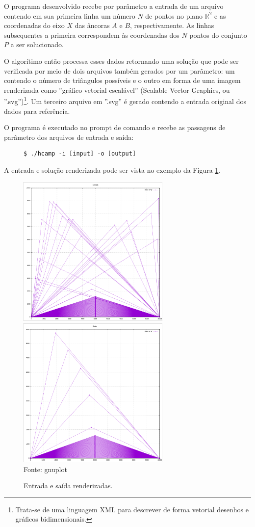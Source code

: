 \documentclass[12pt,a4paper]{article}
\begin{document}
O programa desenvolvido recebe por parâmetro a entrada de um arquivo contendo em sua primeira linha um número $N$ de pontos no plano $\mathbb{R}^2$ e as coordenadas do eixo $X$ das âncoras $A$ e $B$, respectivamente. As linhas subsequentes a primeira correspondem às coordenadas dos $N$ pontos do conjunto $P$ a ser solucionado.

O algorítimo então processa esses dados retornando uma solução que pode ser verificada por meio de dois arquivos também gerados por um parâmetro: um contendo o número de triângulos possíveis e o outro em forma de uma imagem renderizada como ''gráfico vetorial escalável'' (Scalable Vector Graphics, ou ''.svg'')\footnote{Trata-se de uma linguagem XML para descrever de forma vetorial desenhos e gráficos bidimensionais.}. Um terceiro arquivo em ''.svg'' é gerado contendo a entrada original dos dados para referência.

O programa é executado no prompt de comando e recebe as passagens de parâmetro dos arquivos de entrada e saída:

\begin{figure}[!h]
\centering
\begin{BVerbatim}
$ ./hcamp -i [input] -o [output]
\end{BVerbatim}
\end{figure}

A entrada e solução renderizada pode ser vista no exemplo da Figura \ref{fig:inrend}.

\begin{figure}[!h]
	\caption{Entrada e saída renderizadas.}
	\label{fig:inrend}
	\includegraphics[width=75mm]{input.png}
	\hfill
	\includegraphics[width=75mm]{output.png}\\
	\footnotesize Fonte: gnuplot
\end{figure}
\end{document}
